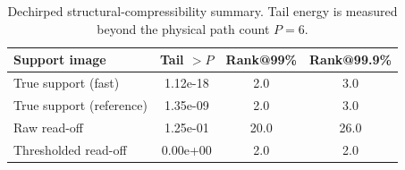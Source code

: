 \begin{table}[t]
\centering
\caption{Dechirped structural-compressibility summary. Tail energy is measured beyond the physical path count $P=6$.}
\label{tab:support_structure}
\begin{tabular}{lccc}
\toprule
Support image & Tail $> P$ & Rank@99\% & Rank@99.9\% \\
\midrule
True support (fast) & 1.12e-18 & 2.0 & 3.0 \\
True support (reference) & 1.35e-09 & 2.0 & 3.0 \\
Raw read-off & 1.25e-01 & 20.0 & 26.0 \\
Thresholded read-off & 0.00e+00 & 2.0 & 2.0 \\
\bottomrule
\end{tabular}
\end{table}
